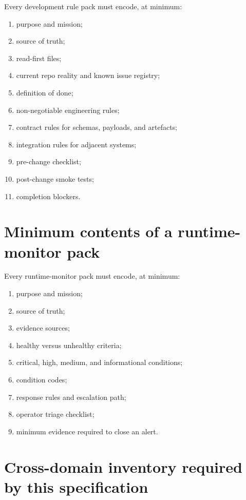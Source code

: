 \documentclass[11pt,a4paper,twoside]{report}
\begin{document}
Every development rule pack must encode, at minimum:
\begin{enumerate}
\item purpose and mission;
\item source of truth;
\item read-first files;
\item current repo reality and known issue registry;
\item definition of done;
\item non-negotiable engineering rules;
\item contract rules for schemas, payloads, and artefacts;
\item integration rules for adjacent systems;
\item pre-change checklist;
\item post-change smoke tests;
\item completion blockers.
\end{enumerate}

\section{Minimum contents of a runtime-monitor pack}

Every runtime-monitor pack must encode, at minimum:
\begin{enumerate}
\item purpose and mission;
\item source of truth;
\item evidence sources;
\item healthy versus unhealthy criteria;
\item critical, high, medium, and informational conditions;
\item condition codes;
\item response rules and escalation path;
\item operator triage checklist;
\item minimum evidence required to close an alert.
\end{enumerate}

\section{Cross-domain inventory required by this specification}
\end{document}
